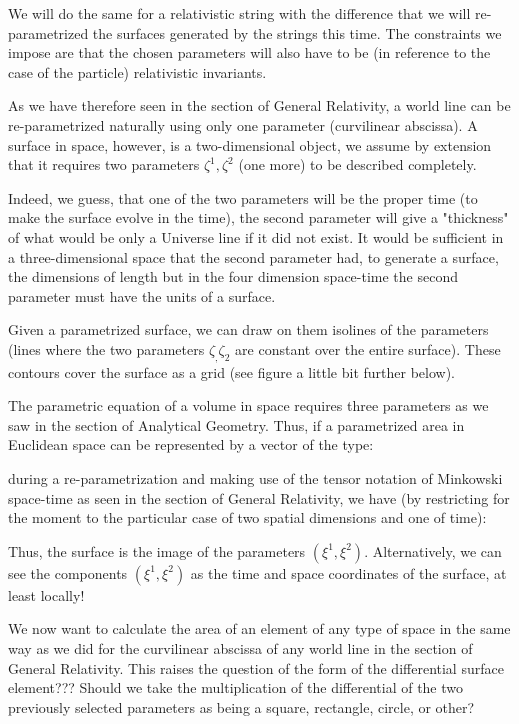 	We will do the same for a relativistic string with the difference that we will re-parametrized the surfaces generated by the strings this time. The constraints we impose are that the chosen parameters will also have to be (in reference to the case of the particle) relativistic invariants.
	
	As we have therefore seen in the section of General Relativity, a world line can be re-parametrized naturally using only one parameter (curvilinear abscissa). A surface in space, however, is a two-dimensional object, we assume by extension that it requires two parameters $\zeta^1,\zeta^2$ (one more) to be described completely.
	
	Indeed, we guess, that one of the two parameters will be the proper time (to make the surface evolve in the time), the second parameter will give a "thickness" of what would be only a Universe line if it did not exist. It would be sufficient in a three-dimensional space that the second parameter had, to generate a surface, the dimensions of length but in the four dimension space-time the second parameter must have the units of a surface.
	
	Given a parametrized surface, we can draw on them isolines of the parameters (lines where the two parameters $\zeta_,\zeta_2$ are constant over the entire surface). These contours cover the surface as a grid (see figure a little bit further below).
	
	The parametric equation of a volume in space requires three parameters as we saw in the section of Analytical Geometry. Thus, if a parametrized area in Euclidean space can be represented by a vector of the type:
	
	during a re-parametrization and making use of the tensor notation of Minkowski space-time as seen in the section of General Relativity, we have (by restricting for the moment to the particular case of two spatial dimensions and one of time):
	
	Thus, the surface is the image of the parameters $(\xi^1,\xi^2)$. Alternatively, we can see the components $(\xi^1,\xi^2)$ as the time and space coordinates of the surface, at least locally!
	
	We now want to calculate the area of an element of any type of space in the same way as we did for the curvilinear abscissa of any world line in the section of General Relativity. This raises the question of the form of the differential surface element??? Should we take the multiplication of the differential of the two previously selected parameters as being a square, rectangle, circle, or other?
	
